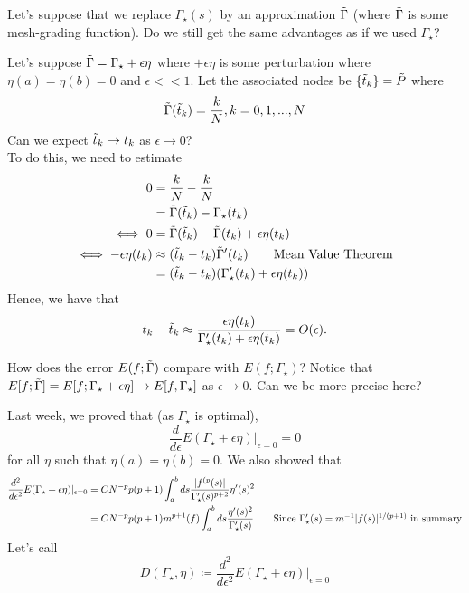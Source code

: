 \documentclass{article}
\begin{document}
\begin{question}
    Let's suppose that we replace $\Gamma_\star(s)$ by an approximation $\Tilde{\Gamma}$ (where $\Tilde{\Gamma}$ is some mesh-grading function). Do we still get the same advantages as if we used $\Gamma_\star$?
\end{question}

Let's suppose $\Tilde{\Gamma} = \Gamma_\star + \epsilon \eta$ where $+\epsilon \eta$ is some perturbation where $\eta(a) = \eta(b) = 0$ and $\epsilon << 1$. Let the associated nodes be $\{\Tilde{t}_k\} = \Tilde{P}$ where
\[\Tilde{\Gamma}(\Tilde{t}_k) = \frac{k}{N}, k = 0, 1, ..., N\]
Can we expect $\Tilde{t}_k \to t_k$ as $\epsilon \to 0$?\\

To do this, we need to estimate
\begin{align*}
    0 &= \frac{k}{N} - \frac{k}{N}\\
    &= \Tilde{\Gamma}(\Tilde{t}_k) - \Gamma_\star(t_k)\\
    \iff 0 &= \Tilde{\Gamma}(\Tilde{t}_k) - \Tilde{\Gamma}(t_k) + \epsilon \eta(t_k)\\
    \iff -\epsilon \eta(t_k) &\approx (\Tilde{t}_k - t_k) \Tilde{\Gamma}'(t_k) \tag*{Mean Value Theorem}\\
    &= (\Tilde{t}_k - t_k) (\Gamma'_\star(t_k) + \epsilon \eta(t_k))
\end{align*}
Hence, we have that
\[t_k - \Tilde{t}_k \approx \frac{\epsilon \eta(t_k)}{\Gamma'_\star(t_k) + \epsilon \eta(t_k)} = O(\epsilon).\]

\begin{question}
    How does the error $E(f; \Tilde{\Gamma})$ compare with $E(f; \Gamma_\star)$? Notice that $E[f; \Tilde{\Gamma}] = E[f; \Gamma_\star + \epsilon \eta] \to E[f, \Gamma_\star]$ as $\epsilon \to 0$. Can we be more precise here? 
\end{question}

Last week, we proved that (as $\Gamma_\star$ is optimal),  
\[\frac{d}{d\epsilon} E(\Gamma_\star + \epsilon \eta) |_{\epsilon = 0} = 0\]
for all $\eta$ such that $\eta(a) = \eta(b) = 0$. We also showed that
\begin{align*}
    \frac{d^2}{d\epsilon^2} E(\Gamma_\star + \epsilon \eta) |_{\epsilon = 0} &= C N^{-p} p(p+1) \int_a^b ds \frac{|f^{(p}(s)|}{\Gamma'_\star(s)^{p+2}} \eta'(s)^2\\
    &= C N^{-p} p (p+1) m^{p+1}(f) \int_a^b ds \frac{\eta'(s)^2}{\Gamma'_\star(s)}  \tag*{Since $\Gamma'_\star(s) = m^{-1} |f(s)|^{1/(p+1)}$ in summary}
\end{align*}
Let's call
\[D(\Gamma_\star, \eta) \coloneqq \frac{d^2}{d\epsilon^2} E(\Gamma_\star + \epsilon \eta) |_{\epsilon = 0} \]
\end{document}
